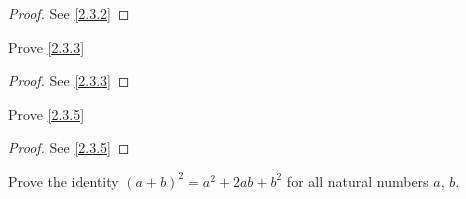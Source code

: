 \begin{proof}
  See \cref{2.3.2}
\end{proof}

\begin{exercise}\label{ex 2.3.2}
  Prove \cref{2.3.3}
\end{exercise}

\begin{proof}
  See \cref{2.3.3}
\end{proof}

\begin{exercise}\label{ex 2.3.3}
  Prove \cref{2.3.5}
\end{exercise}

\begin{proof}
  See \cref{2.3.5}
\end{proof}

\begin{exercise}\label{ex 2.3.4}
  Prove the identity \((a + b)^2 = a^2 + 2ab + b^2\) for all natural numbers \(a\), \(b\).
\end{exercise}


